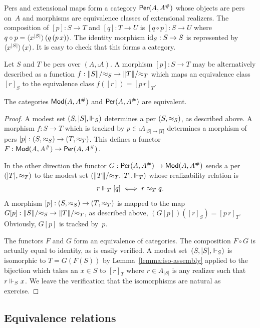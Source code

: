 Pers and extensional maps form a category $\mathsf{Per}(A, A^{\#})$ whose
objects are pers on~$A$ and morphisms are equivalence classes of
extensional realizers. The composition of $[p] : S \to T$ and $[q] : T
\to U$ is $[q \circ p] : S \to U$ where $q \circ p =
\langle x^{|S|} \rangle\,(q\,(p\,x))$. The identity morphism $\mathrm{id}_S : S
\to S$ is represented by $\langle x^{|S|} \rangle\,(x)$. It is easy to
check that this forms a category.

Let $S$ and $T$ be pers over $(A, \comp{A})$. A morphism $[p] : S \to
T$ may be alternatively described as a function $f : \|S\|/{\approx_S}
\to \|T\|/{\approx_T}$ which maps an equivalence class $[r]_S$ to the
equivalence class $f([r]) = [p\,r]_T$.

\begin{proposition}
  The categories $\mathsf{Mod}(A, A^{\#})$ and $\mathsf{Per}(A, A^{\#})$ are
  equivalent.
\end{proposition}

\begin{proof}
  A modest set $(S, |S|, {\Vdash_S})$ determines a per $(S, {\approx_S})$,
  as described above. A morphism $f : S \to T$ which is tracked by $p
  \in \comp{A}_{|S| \to |T|}$ determines a morphism of pers $[p] : (S,
  {\approx_S}) \to (T, {\approx_T})$. This defines a functor $F : \mathsf{Mod}(A,
    A^{\#}) \to \mathsf{Per}(A, A^{\#})$.

  In the other direction the functor $G : \mathsf{Per}(A, A^{\#}) \to
  \mathsf{Mod}(A, A^{\#})$ sends a per $(|T|, {\approx_T})$ to the modest set
  $(\|T\|/{\approx_T}, |T|, {\Vdash_T})$ whose realizability relation is
  \begin{equation*}
    r \Vdash_T [q] \iff r \approx_T q.
  \end{equation*}
  A morphism $[p] : (S, {\approx_S}) \to (T, {\approx_T})$ is mapped to the
  map $G[p] : \|S\|/{\approx_S} \to \|T\|/{\approx_T}$, as described above,
  $(G[p])([r]_S) = [p\,r]_T$. Obviously, $G[p]$ is tracked by~$p$.

  The functors $F$ and $G$ form an equivalence of categories. The
  composition $F \circ G$ is actually equal to identity, as is easily
  verified. A modest set~$(S, |S|, {\Vdash_S})$ is isomorphic to $T =
  G(F(S))$ by Lemma~\ref{lemma:iso-assembly} applied to the bijection
  which takes an $x \in S$ to $[r]_T$ where $r \in A_{|S|}$ is any
  realizer such that $r \Vdash_S x$. We leave the verification that the
  isomorphisms are natural as exercise.
\end{proof}


\subsection{Equivalence relations}
\label{sec:ers}


